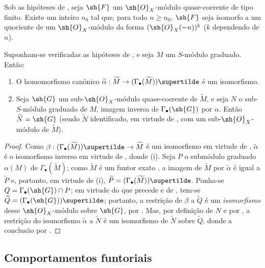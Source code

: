\documentclass[oneside,10pt]{amsart}
\makeatletter
\renewcommand{\geq}{\geqslant}
\newcommand{\ega@arrow}[2]{\mathchoice{#1}{#2}{#2}{#2}}
\renewcommand{\to}{\ega@arrow{\longrightarrow}{\rightarrow}}
\let\EGAOriginalLabel\label
\renewcommand{\label}[1]{\phantomsection\EGAOriginalLabel{#1}}
\makeatother
\begin{document}
\begin{corollary}[2.7.10]
\label{II.2.7.10}
Sob as hipóteses de , seja $\sh{F}$ um $\sh{O}_X$-módulo quase-coerente de tipo finito.
Existe um inteiro $n_0$ tal que, para todo $n\geq n_0$, $\sh{F}$ seja isomorfo a um quociente de um $\sh{O}_X$-módulo da forma $(\sh{O}_X(-n))^k$ ($k$ dependendo de $n$).
\end{corollary}

\begin{proposition}[2.7.11]
\label{II.2.7.11}
Suponham-se verificadas as hipóteses de , e seja $M$ um $S$-módulo graduado.
Então:
\begin{enumerate}
  \item[\rm{(i)}] O homomorfismo canônico $\widetilde{\alpha}:\widetilde{M}\to(\Gamma_\bullet(\widetilde{M}))\supertilde$ é um isomorfismo.
  \item[\rm{(ii)}] Seja $\sh{G}$ um sub-$\sh{O}_X$-módulo quase-coerente de $\widetilde{M}$, e seja $N$ o sub-$S$-módulo graduado de $M$, imagem inversa de $\Gamma_\bullet(\sh{G})$ por $\alpha$.
    Então $\widetilde{N}=\sh{G}$ (sendo $\widetilde{N}$ identificado, em virtude de , com um sub-$\sh{O}_X$-módulo de $\widetilde{M}$).
\end{enumerate}
\end{proposition}

\begin{proof}
Como $\beta:(\Gamma_\bullet(\widetilde{M}))\supertilde\to\widetilde{M}$ é um isomorfismo em virtude de , $\widetilde{\alpha}$ é o isomorfismo inverso em virtude de , donde (i).
Seja $P$ o submódulo graduado $\alpha(M)$ de $\Gamma_\bullet(\widetilde{M})$;
como $\widetilde{M}$ é um funtor exato , a imagem de $\widetilde{M}$ por $\widetilde{\alpha}$ é igual a $\widetilde{P}$ e, portanto, em virtude de (i), $\widetilde{P}=(\Gamma_\bullet(\widetilde{M}))\supertilde$.
Ponha-se $Q=\Gamma_\bullet(\sh{G})\cap P$;
em virtude do que precede e de , tem-se $\widetilde{Q}=(\Gamma_\bullet(\sh{G}))\supertilde$; portanto, a restrição de $\beta$ a $\widetilde{Q}$ é um \emph{isomorfismo} desse $\sh{O}_X$-módulo sobre $\sh{G}$, por .
Mas, por definição de $N$ e por , a restrição do isomorfismo $\widetilde{\alpha}$ a $\widetilde{N}$ é um isomorfismo de $\widetilde{N}$ sobre $\widetilde{Q}$, donde a conclusão por .
\end{proof}

\subsection{Comportamentos funtoriais}
\label{subsection:II.2.8}
\end{document}

